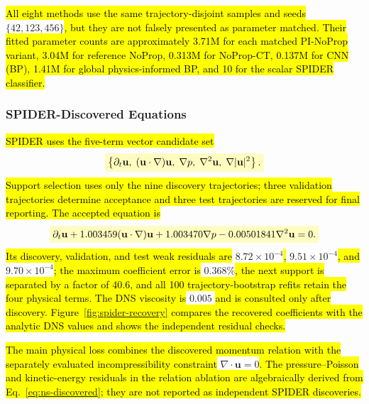 \documentclass[preprint,12pt]{elsarticle}
\newcommand{\rev}[1]{\hl{#1}}
\newcommand{\revmath}[1]{\colorbox{yellow!25}{$#1$}}
\begin{document}
\rev{All eight methods use the same trajectory-disjoint samples and seeds }\revmath{\{42,123,456\}}\rev{, but they are not falsely presented as parameter matched. Their fitted parameter counts are approximately 3.71M for each matched PI-NoProp variant, 3.04M for reference NoProp, 0.313M for NoProp-CT, 0.137M for CNN (BP), 1.41M for global physics-informed BP, and 10 for the scalar SPIDER classifier.}

\subsubsection{SPIDER-Discovered Equations}
\label{sec:discovered-equations}

\rev{SPIDER uses the five-term vector candidate set}
\begin{equation}
\revmath{\displaystyle
\left\{\partial_t\mathbf u,\;(\mathbf u\cdot\nabla)\mathbf u,\;
\nabla p,\;\nabla^2\mathbf u,\;\nabla|\mathbf u|^2\right\}.}
\end{equation}
\rev{Support selection uses only the nine discovery trajectories; three validation trajectories determine acceptance and three test trajectories are reserved for final reporting. The accepted equation is}
\begin{equation}
\label{eq:ns-discovered}
\revmath{\displaystyle
\partial_t\mathbf u+1.003459(\mathbf u\cdot\nabla)\mathbf u
+1.003470\nabla p-0.00501841\nabla^2\mathbf u=0.}
\end{equation}
\rev{Its discovery, validation, and test weak residuals are }\revmath{8.72\times10^{-4}}\rev{, }\revmath{9.51\times10^{-4}}\rev{, and }\revmath{9.70\times10^{-4}}\rev{; the maximum coefficient error is }\revmath{0.368\%}\rev{, the next support is separated by a factor of 40.6, and all 100 trajectory-bootstrap refits retain the four physical terms. The DNS viscosity is }\revmath{0.005}\rev{ and is consulted only after discovery. Figure~\ref{fig:spider-recovery} compares the recovered coefficients with the analytic DNS values and shows the independent residual checks.}

\rev{The main physical loss combines the discovered momentum relation with the separately evaluated incompressibility constraint }\revmath{\nabla\cdot\mathbf u=0}\rev{. The pressure--Poisson and kinetic-energy residuals in the relation ablation are algebraically derived from Eq.~\eqref{eq:ns-discovered}; they are not reported as independent SPIDER discoveries.}
\end{document}
